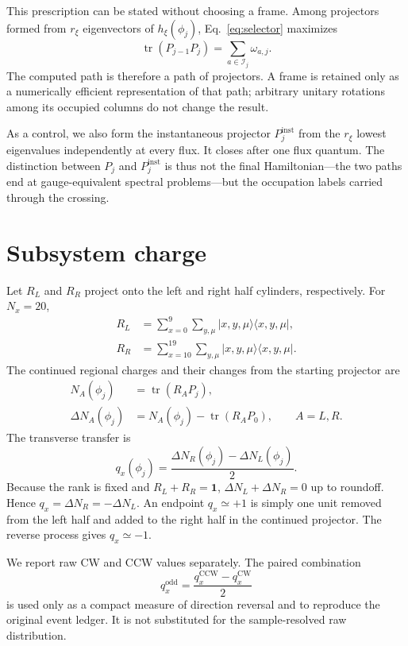 \documentclass[aps,prb,twocolumn,floatfix,nofootinbib,superscriptaddress]{revtex4-2}
\newcommand{\tr}{\operatorname{tr}}
\begin{document}
This prescription can be stated without choosing a frame.  Among projectors
formed from $r_\xi$ eigenvectors of $h_\xi(\phi_j)$, Eq.~\eqref{eq:selector}
maximizes
\begin{equation}
 \tr(P_{j-1}P_j)=\sum_{a\in\mathcal I_j}\omega_{a,j}.
\end{equation}
The computed path is therefore a path of projectors.  A frame is retained only
as a numerically efficient representation of that path; arbitrary unitary
rotations among its occupied columns do not change the result.

As a control, we also form the instantaneous projector $P_j^{\mathrm{inst}}$ from
the $r_\xi$ lowest eigenvalues independently at every flux.  It closes after
one flux quantum.  The distinction between $P_j$ and $P_j^{\mathrm{inst}}$ is thus
not the final Hamiltonian---the two paths end at gauge-equivalent spectral
problems---but the occupation labels carried through the crossing.

\section{Subsystem charge}

Let $R_L$ and $R_R$ project onto the left and right half cylinders,
respectively.  For $N_x=20$,
\begin{align}
 R_L&=\sum_{x=0}^{9}\sum_{y,\mu}|x,y,\mu\rangle\langle x,y,\mu|,\\
 R_R&=\sum_{x=10}^{19}\sum_{y,\mu}|x,y,\mu\rangle\langle x,y,\mu|.
\end{align}
The continued regional charges and their changes from the starting projector
are
\begin{align}
 N_A(\phi_j)&=\tr(R_AP_j),\\
 \Delta N_A(\phi_j)&=N_A(\phi_j)-\tr(R_AP_0),
 \qquad A=L,R .
\end{align}
The transverse transfer is
\begin{equation}
 q_x(\phi_j)=\frac{\Delta N_R(\phi_j)-\Delta N_L(\phi_j)}{2}.
 \label{eq:qx}
\end{equation}
Because the rank is fixed and $R_L+R_R=\mathbf{1}$,
$\Delta N_L+\Delta N_R=0$ up to roundoff.  Hence
$q_x=\Delta N_R=-\Delta N_L$.  An endpoint $q_x\simeq+1$ is simply one unit
removed from the left half and added to the right half in the continued
projector.  The reverse process gives $q_x\simeq-1$.

We report raw CW and CCW values separately.  The paired combination
\begin{equation}
 q_x^{\mathrm{odd}}=\frac{q_x^{\mathrm{CCW}}-q_x^{\mathrm{CW}}}{2}
 \label{eq:qodd}
\end{equation}
is used only as a compact measure of direction reversal and to reproduce the
original event ledger.  It is not substituted for the sample-resolved raw
distribution.
\end{document}
